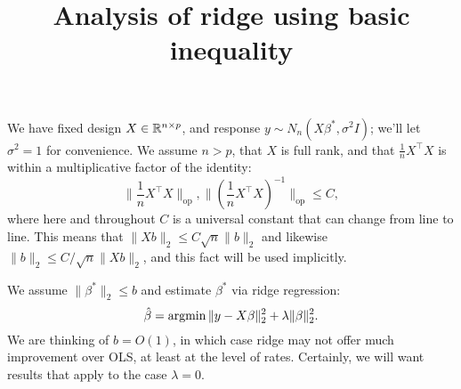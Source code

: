 \documentclass{article}
\title{ {\bf Analysis of ridge using basic inequality} }
\begin{document}
	
	\maketitle
	\RaggedRight
	We have fixed design $X \in \mathbb{R}^{n \times p}$, and response $y \sim N_n(X\beta^{\ast}, \sigma^2 I)$; we'll let $\sigma^2 = 1$ for convenience. We assume $n > p$, that $X$ is full rank, and that $\frac{1}{n} X^{\top} X$ is within a multiplicative factor of the identity:
	$$
	\|\frac{1}{n} X^{\top} X\|_{\mathrm{op}}, \|(\frac{1}{n} X^{\top} X)^{-1}\|_{\mathrm{op}} \leq C,
	$$
	where here and throughout $C$ is a universal constant that can change from line to line. This means that $\|Xb\|_2 \leq C \sqrt{n} \|b\|_2$ and likewise $\|b\|_2 \leq C/\sqrt{n} \|Xb\|_2$, and this fact will be used implicitly. 
	
	We assume $\|\beta^{\ast}\|_2 \leq b$ and estimate $\beta^{\ast}$ via ridge regression:
	$$
	\hat{\beta} = \mathop{\mathrm{argmin}} \|y - X\beta\|_2^2 + \lambda \|\beta\|_2^2.
	$$
	We are thinking of $b = O(1)$, in which case ridge may not offer much improvement over OLS, at least at the level of rates. Certainly, we will want results that apply to the case $\lambda = 0$.
	
\end{document}
